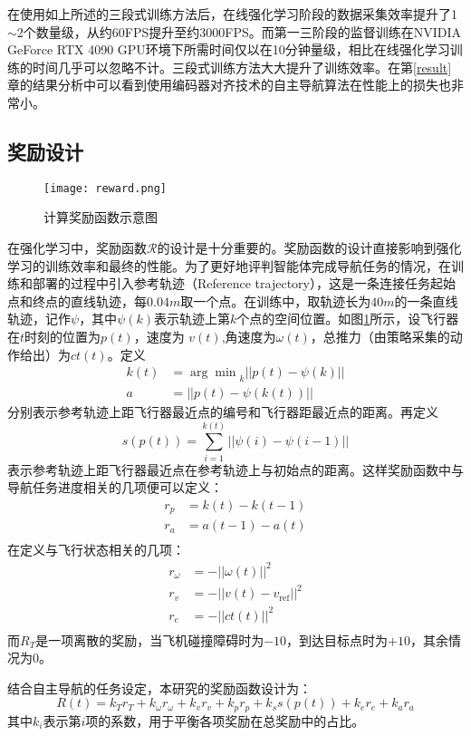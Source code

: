 在使用如上所述的三段式训练方法后，在线强化学习阶段的数据采集效率提升了1$\sim$2个数量级，从约60FPS提升至约3000FPS。而第一三阶段的监督训练在NVIDIA GeForce RTX 4090 GPU环境下所需时间仅以在10分钟量级，相比在线强化学习训练的时间几乎可以忽略不计。三段式训练方法大大提升了训练效率。在第\ref{result}章的结果分析中可以看到使用编码器对齐技术的自主导航算法在性能上的损失也非常小。

\subsection{奖励设计}
\label{reward_design}
\begin{figure}
  \centering
  \texttt{[image: reward.png]}
  \caption{计算奖励函数示意图}
  \label{fig_reward}
\end{figure}
在强化学习中，奖励函数$\mathcal{R}$的设计是十分重要的。奖励函数的设计直接影响到强化学习的训练效率和最终的性能。为了更好地评判智能体完成导航任务的情况，在训练和部署的过程中引入参考轨迹（Reference trajectory），这是一条连接任务起始点和终点的直线轨迹，每$0.04m$取一个点。在训练中，取轨迹长为$40m$的一条直线轨迹，记作$\psi$，其中$\psi(k)$表示轨迹上第$k$个点的空间位置。如图\ref{fig_reward}所示，设飞行器在$t$时刻的位置为$p(t)$，速度为 $v(t)$,角速度为$\omega(t)$，总推力（由策略采集的动作给出）为$ct(t)$。定义
\[\begin{aligned}
  k(t) &= {\arg\min}_k {||p(t)-\psi(k)||}\\
  a &= ||p(t)-\psi(k(t))||
\end{aligned}\]
分别表示参考轨迹上距飞行器最近点的编号和飞行器距最近点的距离。再定义
\[
  s(p(t)) = \sum_{i=1}^{k(t)} ||\psi(i)-\psi(i-1)||
\]
表示参考轨迹上距飞行器最近点在参考轨迹上与初始点的距离。这样奖励函数中与导航任务进度相关的几项便可以定义：
\[\begin{aligned}
  r_p &= k(t)-k(t-1)\\
  r_a &= a(t-1)-a(t)\\
\end{aligned}\]
在定义与飞行状态相关的几项：
\[\begin{aligned}
  r_\omega &= -||\omega(t)||^2\\
  r_v &= -||v(t)-v_\text{ref}||^2\\
  r_e & = -||ct(t)||^2\\
\end{aligned}\]
而$R_T$是一项离散的奖励，当飞机碰撞障碍时为$-10$，到达目标点时为$+10$，其余情况为$0$。

结合自主导航的任务设定，本研究的奖励函数设计为：
\[
  R(t) = k_Tr_T + k_\omega r_\omega + k_v r_v+ k_p r_p + k_s s(p(t))+ k_e r_e + k_a r_a
\]
其中$k_i$表示第$i$项的系数，用于平衡各项奖励在总奖励中的占比。

